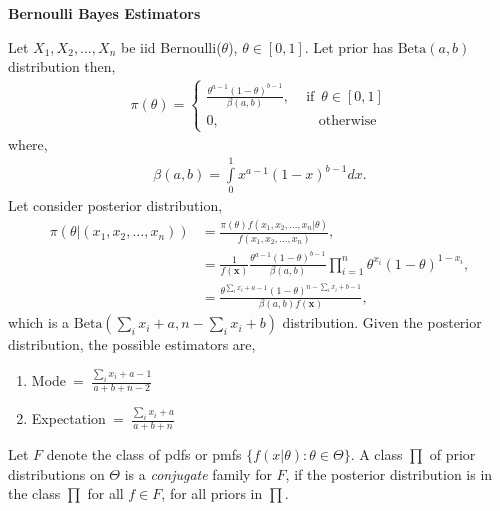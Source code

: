 \documentclass[a4paper,english,12pt]{article}
\begin{document}
\begin{exmp}\textbf{Bernoulli Bayes Estimators}
\par Let $X_1,X_2,\dots,X_n$ be iid Bernoulli($\theta$), $\theta \in [0,1]$. Let prior has $\mathrm{Beta}(a,b)$ distribution then,
\begin{align}
\pi(\theta) = 
\begin{cases}
 \displaystyle{\frac{\theta^{a-1}(1-\theta)^{b-1}}{\beta(a,b)}},       \,\,\,\,\,\,\,\mbox{if}\,\,\,\theta \in [0,1] \\
0,\hspace{85pt}\mbox{otherwise}
\end{cases}
\end{align} 
where,
\begin{align}
\beta(a,b) = \displaystyle{\int\limits_0^1 x^{a-1}(1-x)^{b-1}dx}.
\end{align}
Let consider posterior distribution,
\begin{align}
\pi(\theta|(x_1,x_2,\dots,x_n))&=\displaystyle{\frac{\pi(\theta)f(x_1,x_2,\dots,x_n|\theta)}{f(x_1,x_2,\dots,x_n)}},\\
&=\displaystyle{ \frac{1}{f(\textbf{x})} \frac{\theta^{a-1}(1-\theta)^{b-1}}{\beta(a,b)} \prod\limits_{i=1}^n{\theta^{x_i}(1-\theta)^{1-x_i}}},\nonumber\\
&=\displaystyle{\frac{\theta^{\sum\limits_i {x_i}+a-1}(1-\theta)^{n-\sum\limits_i x_i +b-1}}{\beta(a,b)f(\textbf{x})}},\nonumber
\end{align}
which is a $\mathrm{Beta}\left(\sum\limits_i {x_i}+a,n-\sum\limits_i x_i +b\right)$ distribution.  
Given the posterior distribution, the possible estimators are,
\begin{enumerate}
\item Mode\,\,\,=\,\,\,$\displaystyle{\frac{\sum\limits_i {x_i}+a-1}{a+b+n-2}}$
\item Expectation\,\,\,=\,\,\,$\displaystyle{\frac{\sum\limits_i {x_i}+a}{a+b+n}}$
\end{enumerate}
\end{exmp}
\begin{defn}{Let $F$ denote the class of pdfs or pmfs $\{f(x|\theta):\theta \in \Theta\}$. A class $\prod$ of prior distributions on $\Theta$ is a \textit{conjugate} family for $F$, if the posterior distribution is in the class $\prod$ for all $f \in F$, for all priors in $\prod$.}
\end{defn}
\end{document}
